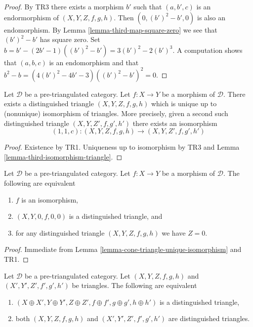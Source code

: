 \begin{proof}
By TR3 there exists a morphism $b'$ such that
$(a, b', c)$ is an endormorphism of $(X, Y, Z, f, g, h)$.
Then $(0, (b')^2 - b', 0)$ is also an endomorphism. By
Lemma \ref{lemma-third-map-square-zero}
we see that $(b')^2 - b'$ has square zero.
Set $b = b' - (2b' - 1)((b')^2 - b') = 3(b')^2 - 2(b')^3$.
A computation shows that $(a, b, c)$ is an endomorphism and
that $b^2 - b = (4(b')^2 - 4b' - 3)((b')^2 - b')^2 = 0$.
\end{proof}

\begin{lemma}
\label{lemma-cone-triangle-unique-isomorphism}
Let $\mathcal{D}$ be a pre-triangulated category.
Let $f : X \to Y$ be a morphism of $\mathcal{D}$.
There exists a distinguished triangle $(X, Y, Z, f, g, h)$ which
is unique up to (nonunique) isomorphism of triangles.
More precisely, given a second such distinguished triangle
$(X, Y, Z', f, g', h')$ there exists an isomorphism
$$
(1, 1, c) : (X, Y, Z, f, g, h) \longrightarrow (X, Y, Z', f, g', h')
$$
\end{lemma}

\begin{proof}
Existence by TR1. Uniqueness up to isomorphism by TR3 and
Lemma \ref{lemma-third-isomorphism-triangle}.
\end{proof}

\begin{lemma}
\label{lemma-third-object-zero}
Let $\mathcal{D}$ be a pre-triangulated category.
Let $f : X \to Y$ be a morphism of $\mathcal{D}$.
The following are equivalent
\begin{enumerate}
\item $f$ is an isomorphism,
\item $(X, Y, 0, f, 0, 0)$ is a distinguished triangle, and
\item for any distinguished triangle $(X, Y, Z, f, g, h)$ we have $Z = 0$.
\end{enumerate}
\end{lemma}

\begin{proof}
Immediate from
Lemma \ref{lemma-cone-triangle-unique-isomorphism}
and TR1.
\end{proof}

\begin{lemma}
\label{lemma-direct-sum-triangles}
Let $\mathcal{D}$ be a pre-triangulated category.
Let $(X, Y, Z, f, g, h)$ and $(X', Y', Z', f', g', h')$ be triangles.
The following are equivalent
\begin{enumerate}
\item $(X \oplus X', Y \oplus Y', Z \oplus Z',
f \oplus f', g \oplus g', h \oplus h')$
is a distinguished triangle,
\item both $(X, Y, Z, f, g, h)$ and $(X', Y', Z', f', g', h')$ are
distinguished triangles.
\end{enumerate}
\end{lemma}

